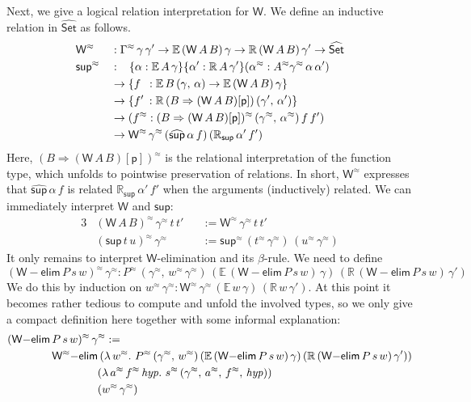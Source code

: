 \documentclass[acmsmall,screen,review,anonymous]{acmart}
\newcommand{\msf}[1]{{\mathsf{#1}}}
\newcommand{\mbb}[1]{\mathbb{#1}}
\newcommand{\rel}{^{\approx}}
\newcommand{\p}{\mathsf{p}}
\newcommand{\wh}[1]{\widehat{#1}}
\newcommand{\whset}{\wh{\Set}}
\newcommand{\ev}{\mbb{E}}
\newcommand{\re}{\mbb{R}}
\newcommand{\welim}{\vW{-}\msf{elim}}
\newcommand{\vW}{\mathsf{W}}
\newcommand{\vsup}{\mathsf{sup}}
\newcommand{\Set}{\msf{Set}}
\theoremstyle{remark}
\begin{document}
Next, we give a logical relation interpretation for $\vW$. We define an
inductive relation in $\whset$ as follows.
\begin{alignat*}{3}
  & \vW\rel &&: \Gamma\rel\,\gamma\,\gamma' \to \ev\,(\vW\,A\,B)\,\gamma \to \re\,(\vW\,A\,B)\,\gamma' \to \whset\\
  & \vsup\rel &&: \hspace{0.8em}\{\alpha : \ev\,A\,\gamma\}\{\alpha' : \re\,A\,\gamma'\}(\alpha\rel : A\rel \gamma\rel\,\alpha\,\alpha')\\
  &           &&\to \{f \hspace{0.5em}: \ev\,B\,(\gamma,\,\alpha) \to \ev\,(\vW\,A\,B)\,\gamma\}\\
  &           &&\to \{f' \hspace{0.2em}: \re\,(B \Rightarrow (\vW\,A\,B)[\p])\,(\gamma',\,\alpha')\}\\
  &           &&\to (f\rel : (B \Rightarrow (\vW\,A\,B)[\p])\rel\,(\gamma\rel,\,\alpha\rel)\,f\,f')\\
  &           &&\to \vW\rel\,\gamma\rel\,(\wh{\vsup}\,\alpha\,f)\,(\re_\vsup\,\alpha'\,f')
\end{alignat*}
Here, $(B \Rightarrow (\vW\,A\,B)[\p])\rel$ is the relational interpretation of the function type, which unfolds to
pointwise preservation of relations. In short, $\vW\rel$ expresses that $\wh{\vsup}\,\alpha\,f$ is related $\re_\vsup\,\alpha'\,f'$
when the arguments (inductively) related. We can immediately interpret $\vW$ and $\vsup$:
\begin{alignat*}{3}
  & (\vW\,A\,B)\rel\,\gamma\rel\,t\,t' &&:= \vW\rel\,\gamma\rel\,t\,t'\\
  & (\vsup\,t\,u)\rel\,\gamma\rel      &&:= \vsup\rel\,(t\rel\,\gamma\rel)\,(u\rel\,\gamma\rel)
\end{alignat*}
It only remains to interpret $\vW$-elimination and its $\beta$-rule. We need to define
\[ (\vW{-}\msf{elim}\,P\,s\,w)\rel\,\gamma\rel : P\rel\,(\gamma\rel,\,w\rel\,\gamma\rel)\,(\ev\,(\welim\,P\,s\,w)\,\gamma)\,(\re\,(\welim\,P\,s\,w)\,\gamma') \]
We do this by induction on $w\rel\,\gamma\rel :
\vW\rel\,\gamma\rel\,(\ev\,w\,\gamma)\,(\re\,w\,\gamma')$. At this point it
becomes rather tedious to compute and unfold the involved types, so we only give
a compact definition here together with some informal explanation:
\begin{alignat*}{3}
  &(\vW{-}\msf{elim}\,P\,s\,w)\rel\,\gamma\rel :=\\
  &\hspace{4em}\vW\rel{-}\msf{elim}\,(\lambda\,w\rel.\,\,P\rel\,(\gamma\rel,\,w\rel)\,(\ev\,(\welim\,P\,s\,w)\,\gamma)\,(\re\,(\welim\,P\,s\,w)\,\gamma'))\\
  &\hspace{8.1em}(\lambda\,a\rel\,f\rel\,\mathit{hyp}.\,\,s\rel\,(\gamma\rel,\,a\rel,\,f\rel,\,\mathit{hyp}))\\
  &\hspace{8.1em}(w\rel\,\gamma\rel)
\end{alignat*}
\end{document}
